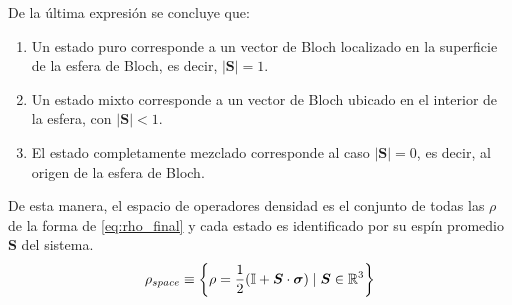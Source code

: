 \documentclass[../Main.tex]{subfiles}
\begin{document}
De la última expresión se concluye que:

\begin{enumerate}
    \item Un estado puro corresponde a un vector de Bloch localizado en la superficie de la esfera de Bloch, es decir, $|\bm{S}|=1$.
    \item Un estado mixto corresponde a un vector de Bloch ubicado en el interior de la esfera, con $|\bm{S}|<1$.
    \item El estado completamente mezclado corresponde al caso $|\bm{S}|=0$, es decir, al origen de la esfera de Bloch.
\end{enumerate}

De esta manera, el espacio de operadores densidad es el conjunto de todas las $\rho$ de la forma de \eqref{eq:rho_final} y cada estado es identificado por su espín promedio $\bm{S}$ del sistema.
\begin{equation}
    \rho_{space}\equiv\qty{\rho=\frac{1}{2}\qty(\mathbb{I}+ \bm{S}\cdot \bm{\sigma})\;|\;\bm{S}\in \mathbb{R}^3 }
\end{equation}
\end{document}
